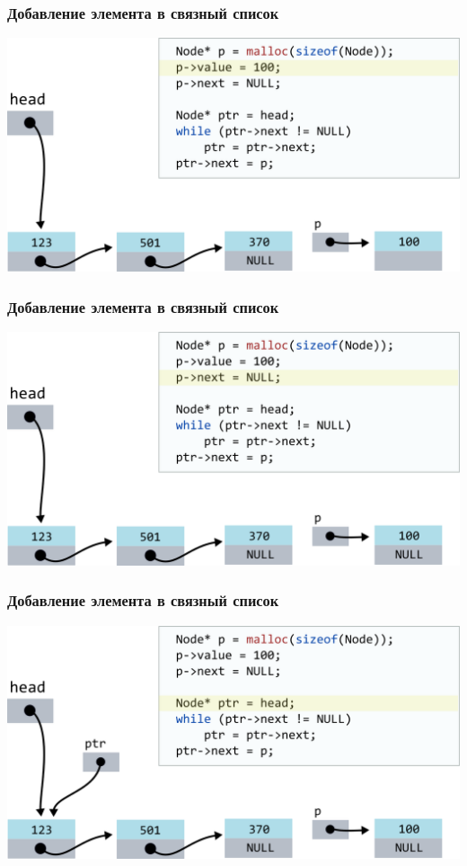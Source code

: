 \documentclass[10pt,pdf,hyperref={unicode}]{beamer}
\begin{document}
\begin{frame}[fragile]
\frametitle{Добавление элемента в связный список}
\begin{center}
\includegraphics[scale=0.6]{images/list/codelistf_insert3.png}
\end{center}
\end{frame}

\begin{frame}[fragile]
\frametitle{Добавление элемента в связный список}
\begin{center}
\includegraphics[scale=0.6]{images/list/codelistf_insert4.png}
\end{center}
\end{frame}


\begin{frame}[fragile]
\frametitle{Добавление элемента в связный список}
\begin{center}
\includegraphics[scale=0.6]{images/list/codelistf_insert5.png}
\end{center}
\end{frame}
\end{document}
